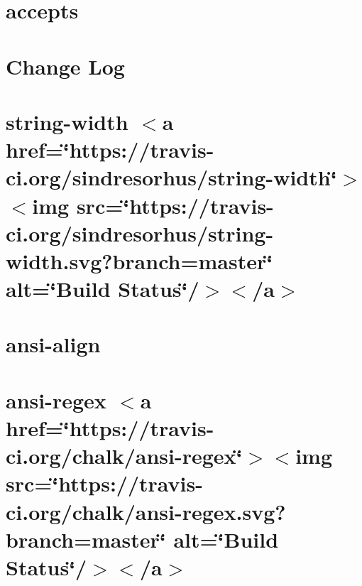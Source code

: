 \let\mypdfximage\pdfximage\def\pdfximage{\immediate\mypdfximage}\documentclass[twoside]{book}
\newcommand{\+}{\discretionary{\mbox{\scriptsize$\hookleftarrow$}}{}{}}
\begin{document}
\chapter{accepts}
\label{md__c_1__git_hub__p_r_o_y_e_c_t_o-_i_i_i-_g_o_t_rest-api_node_modules_accepts__r_e_a_d_m_e}

\chapter{Change Log}
\label{md__c_1__git_hub__p_r_o_y_e_c_t_o-_i_i_i-_g_o_t_rest-api_node_modules_ansi-align__c_h_a_n_g_e_l_o_g}

\chapter{string-\/width $<$a href=\char`\"{}https\+://travis-\/ci.\+org/sindresorhus/string-\/width\char`\"{}$>$$<$img src=\char`\"{}https\+://travis-\/ci.\+org/sindresorhus/string-\/width.\+svg?branch=master\char`\"{} alt=\char`\"{}\+Build Status\char`\"{}/$>$$<$/a$>$}
\label{md__c_1__git_hub__p_r_o_y_e_c_t_o-_i_i_i-_g_o_t_rest-api_node_modules_ansi-align_node_modules_string-width_readme}

\chapter{ansi-\/align}
\label{md__c_1__git_hub__p_r_o_y_e_c_t_o-_i_i_i-_g_o_t_rest-api_node_modules_ansi-align__r_e_a_d_m_e}

\chapter{ansi-\/regex $<$a href=\char`\"{}https\+://travis-\/ci.\+org/chalk/ansi-\/regex\char`\"{}$>$$<$img src=\char`\"{}https\+://travis-\/ci.\+org/chalk/ansi-\/regex.\+svg?branch=master\char`\"{} alt=\char`\"{}\+Build Status\char`\"{}/$>$$<$/a$>$}
\label{md__c_1__git_hub__p_r_o_y_e_c_t_o-_i_i_i-_g_o_t_rest-api_node_modules_ansi-regex_readme}

\end{document}
